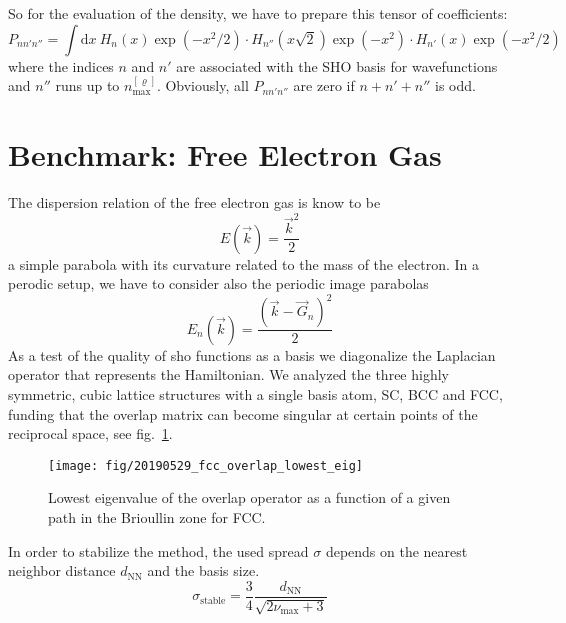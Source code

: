 \documentclass[oribibl]{llncs}
\newcommand{\um}[1]{_{\mathrm{#1}}}
\begin{document}
So for the evaluation of the density,
we have to prepare this tensor of coefficients:
\begin{equation}
	P_{nn'n''} = \int \mathrm d x \ H_{n}(x) \exp(-x^2/2) \cdot H_{n''}(x\sqrt{2}) \exp(-x^2) \cdot H_{n'}(x) \exp(-x^2/2)
\end{equation}
where the indices $n$ and $n'$ are associated with the SHO basis for wavefunctions
and $n''$ runs up to $n\um{max}^{[\varrho]}$. 
Obviously, all $P_{nn'n''}$ are zero if $n + n' + n''$ is odd.



\section{Benchmark: Free Electron Gas}
The dispersion relation of the free electron gas is know to be
\begin{equation}
	E(\vec k)= \frac {\vec k^2} 2
\end{equation}
a simple parabola with its curvature related to the mass of the electron.
In a perodic setup, we have to consider also the periodic image parabolas
\begin{equation}
	E_n(\vec k) = \frac {(\vec k - \vec G_n)^2} 2
\end{equation}
As a test of the quality of \ac{sho} functions as a basis
we diagonalize the Laplacian operator that represents the
Hamiltonian.
We analyzed the three highly symmetric, cubic lattice structures with a single basis atom,
SC, BCC and FCC, funding that the overlap matrix can become singular at certain points of
the reciprocal space, see fig.~\ref{fig:overlap_lowest_eig}.
%
\begin{figure}
  \begin{minipage}[c]{.990\textwidth}
	\texttt{[image: fig/20190529\_fcc\_overlap\_lowest\_eig]} %
  \end{minipage}\hfill
  \begin{minipage}[c]{.009\textwidth}
  \end{minipage}
  \label{fig:overlap_lowest_eig}
  \caption{
	Lowest eigenvalue of the overlap operator as a function of a given path in the Brioullin zone for FCC.
  }
\end{figure}
%
%
In order to stabilize the method, the used spread $\sigma$ depends on the nearest neighbor distance $d\um{NN}$
and the basis size.
\begin{equation}
	\sigma\um{stable} = \frac34 \frac{ d\um{NN} }{ \sqrt{2 \nu\um{max} + 3} }
\end{equation}
\end{document}
